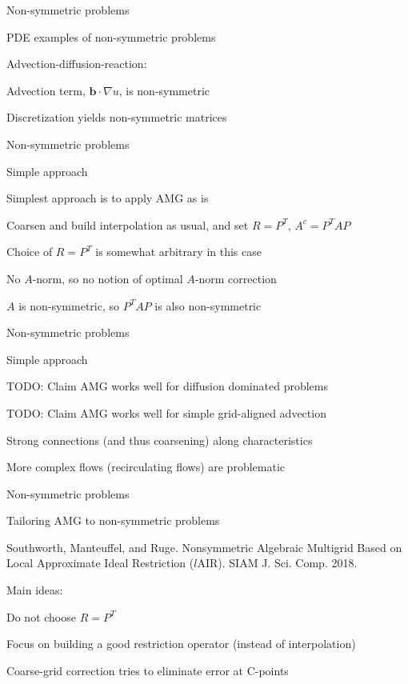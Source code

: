 \documentclass[18pt,xcolor=table]{beamer}
\begin{document}
\begin{frame}{Non-symmetric problems}
\begin{block}{PDE examples of non-symmetric problems}
\bit
\item Advection-diffusion-reaction:
\item Advection term, $\mathbf{b}\cdot\nabla u$, is non-symmetric
\item Discretization yields non-symmetric matrices
\eit
\end{block}
\end{frame}

\begin{frame}{Non-symmetric problems}
\begin{block}{Simple approach}
\bit
\item Simplest approach is to apply AMG as is
\item Coarsen and build interpolation as usual, and set $R = P^T$, $A^c = P^TAP$
\item Choice of $R = P^T$ is somewhat arbitrary in this case
\bit
\item No $A$-norm, so no notion of optimal $A$-norm correction
\item $A$ is non-symmetric, so $P^TAP$ is also non-symmetric
\eit
\eit
\end{block}
\end{frame}

\begin{frame}{Non-symmetric problems}
\begin{block}{Simple approach}
\bit
\item TODO: Claim AMG works well for diffusion dominated problems
\item TODO: Claim AMG works well for simple grid-aligned advection
\item Strong connections (and thus coarsening) along characteristics
\item More complex flows (recirculating flows) are problematic
\eit
\end{block}
\end{frame}

\begin{frame}{Non-symmetric problems}
\begin{block}{Tailoring AMG to non-symmetric problems}
\bit
\item Southworth, Manteuffel, and Ruge. Nonsymmetric Algebraic Multigrid Based on Local Approximate Ideal Restriction ($l$AIR). SIAM J. Sci. Comp. 2018.
\item Main ideas: 
\bit
\item Do not choose $R = P^T$
\item Focus on building a good restriction operator (instead of interpolation)
\item Coarse-grid correction tries to eliminate error at C-points
\eit
\eit
\end{block}
\end{frame}
\end{document}
